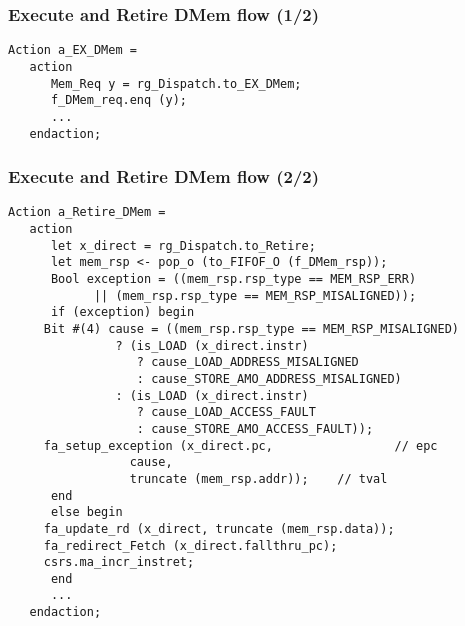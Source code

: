 
\begin{frame}[fragile]
\frametitle{Execute and Retire DMem flow (1/2)}

\footnotesize

\begin{minipage}{0.725\textwidth}
\begin{Verbatim}[frame=single, label=From src\_Drum/CPU.bsv]
   Action a_EX_DMem =
   action
      Mem_Req y = rg_Dispatch.to_EX_DMem;
      f_DMem_req.enq (y);
      ...
   endaction;
\end{Verbatim}
\end{minipage}

\end{frame}


\begin{frame}[fragile]
\frametitle{Execute and Retire DMem flow (2/2)}

\footnotesize

\begin{minipage}{0.725\textwidth}\scriptsize
\begin{Verbatim}[frame=single, label=From src\_Drum/CPU.bsv]
   Action a_Retire_DMem =
   action
      let x_direct = rg_Dispatch.to_Retire;
      let mem_rsp <- pop_o (to_FIFOF_O (f_DMem_rsp));
      Bool exception = ((mem_rsp.rsp_type == MEM_RSP_ERR)
			|| (mem_rsp.rsp_type == MEM_RSP_MISALIGNED));
      if (exception) begin
	 Bit #(4) cause = ((mem_rsp.rsp_type == MEM_RSP_MISALIGNED)
			   ? (is_LOAD (x_direct.instr)
			      ? cause_LOAD_ADDRESS_MISALIGNED
			      : cause_STORE_AMO_ADDRESS_MISALIGNED)
			   : (is_LOAD (x_direct.instr)
			      ? cause_LOAD_ACCESS_FAULT
			      : cause_STORE_AMO_ACCESS_FAULT));
	 fa_setup_exception (x_direct.pc,                 // epc
			     cause,
			     truncate (mem_rsp.addr));    // tval
      end
      else begin
	 fa_update_rd (x_direct, truncate (mem_rsp.data));
	 fa_redirect_Fetch (x_direct.fallthru_pc);
	 csrs.ma_incr_instret;
      end
      ...
   endaction;
\end{Verbatim}
\end{minipage}

\end{frame}


